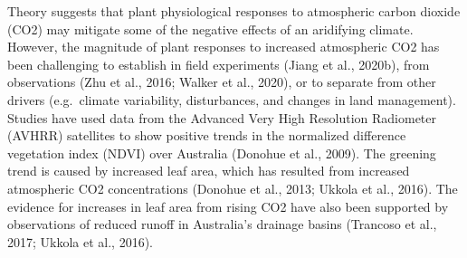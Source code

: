 \documentclass[gc, manuscript]{copernicus}
\begin{document}
Theory suggests that plant physiological responses to atmospheric carbon
dioxide (CO2) may mitigate some of the negative effects of an aridifying
climate. However, the magnitude of plant responses to increased
atmospheric CO2 has been challenging to establish in field experiments
(Jiang et al., 2020b), from observations (Zhu et al., 2016; Walker et
al., 2020), or to separate from other drivers (e.g.~climate variability,
disturbances, and changes in land management). Studies have used data
from the Advanced Very High Resolution Radiometer (AVHRR) satellites to
show positive trends in the normalized difference vegetation index
(NDVI) over Australia (Donohue et al., 2009). The greening trend is
caused by increased leaf area, which has resulted from increased
atmospheric CO2 concentrations (Donohue et al., 2013; Ukkola et al.,
2016). The evidence for increases in leaf area from rising CO2 have also
been supported by observations of reduced runoff in Australia's drainage
basins (Trancoso et al., 2017; Ukkola et al., 2016).
\end{document}
